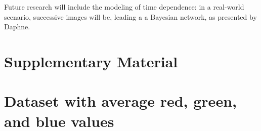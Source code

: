 \documentclass{article}
\begin{document}
Future research will include the modeling of time dependence: in a
real-world scenario, successive images will be, leading a a Bayesian
network, as presented by Daphne.


\appendix

\section{Supplementary Material}

\section{Dataset with average red, green, and blue values}
\begin{center}
\end{center}
\end{document}
